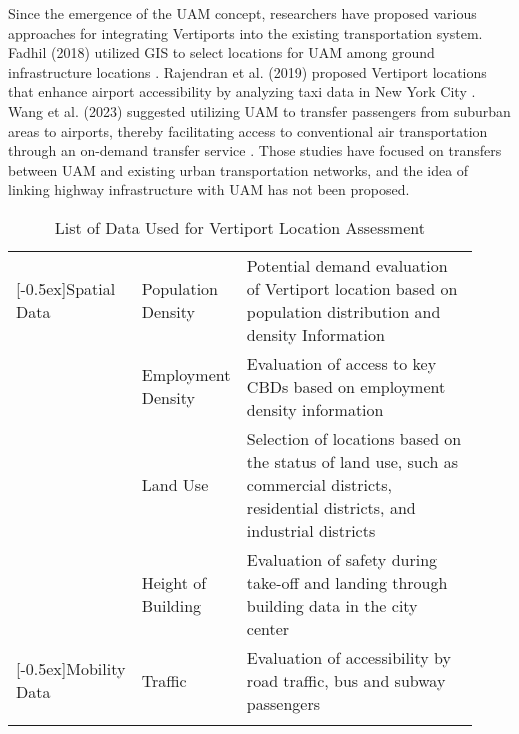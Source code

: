 Since the emergence of the UAM concept, researchers have proposed various approaches for integrating Vertiports into the existing transportation system. Fadhil (2018) utilized GIS to select locations for UAM among ground infrastructure locations \cite{fadhil2018gis}. Rajendran et al. (2019) proposed Vertiport locations that enhance airport accessibility by analyzing taxi data in New York City \cite{rajendran2019}. Wang et al. (2023) suggested utilizing UAM to transfer passengers from suburban areas to airports, thereby facilitating access to conventional air transportation through an on-demand transfer service \cite{wang2023}. Those studies have focused on transfers between UAM and existing urban transportation networks, and the idea of linking highway infrastructure with UAM has not been proposed.


\begin{table}[H]
    \caption{List of Data Used for Vertiport Location Assessment}\label{tab:Major Data}
        \begin{center}
        \begin{tabular}{>{\raggedright\arraybackslash}m{0.2\linewidth}>{\raggedright\arraybackslash}m{0.22\linewidth}>{\raggedright\arraybackslash}m{0.5\linewidth}} \toprule[1.5pt]
            \multicolumn{1}{c}{\textbf{Category}} & \multicolumn{1}{c}{\textbf{Data}} & \multicolumn{1}{c}{\textbf{Application}} \\ 
            \midrule[1.5pt]
            \multirow{4}{*}[-0.5ex]{Spatial Data} & Population Density \cite{straubinger2021_employment, macias2023integrated} & Potential demand evaluation of Vertiport location based on population distribution and density Information \\ \cline{2-3}
             & Employment Density \cite{straubinger2021_employment, daskilewicz2018progress} & Evaluation of access to key CBDs based on employment density information \\ \cline{2-3}
             & Land Use \cite{yedavalli_land, vascik2019development} & Selection of locations based on the status of land use, such as commercial districts, residential districts, and industrial districts \\ \cline{2-3}
             & Height of Building \cite{lee2023, vascik2020geometric} & Evaluation of safety during take-off and landing through building data in the city center \\ \hline
            \multirow{4}{*}[-0.5ex]{Mobility Data} & Traffic \cite{bulusu2021, rajendran2023capacitated} & Evaluation of accessibility by road traffic, bus and subway passengers \\ \cline{2-3}

\end{tabular}
\end{center}
\end{table}
